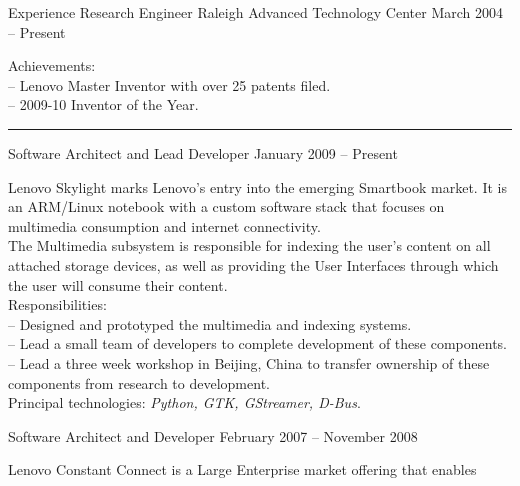 \documentclass[letterpaper, 11pt]{article}
\begin{document}
    \begin{resume}
        \begin{category}{Experience}
                                         {Research Engineer}
                     {Raleigh Advanced Technology Center} {March 2004 -- Present}
            \par
            Achievements: \\
            -- Lenovo Master Inventor with over 25 patents filed. \\
            -- 2009-10 Inventor of the Year. \\
            \rule[1ex]{\textwidth}{1pt}
            \begin{block}
                 {Software Architect and Lead Developer}
                         { }               {January 2009 -- Present}
                \par
                Lenovo Skylight marks Lenovo's entry into the emerging Smartbook market.
                It is an ARM/Linux notebook with a custom software stack that focuses
                on multimedia consumption and internet connectivity.
                \\[1ex]
                The Multimedia subsystem is responsible for indexing the user's content on all
                attached storage devices, as well as providing the User Interfaces through which
                the user will consume their content.
                \\[1ex]
                Responsibilities: \\
                -- Designed and prototyped the multimedia and indexing systems. \\
                -- Lead a small team of developers to complete development of these components. \\
                -- Lead a three week workshop in Beijing, China to transfer ownership of these components from research to development.
                \\[1ex]
                Principal technologies: \emph{Python, GTK, GStreamer, D-Bus}.
                \smallskip
            \end{block}
            \begin{block}
                 {Software Architect and Developer}
                         { }                       {February 2007 -- November 2008}
                \par
                Lenovo Constant Connect is a Large Enterprise market offering that enables

\end{block}
\end{category}
\end{resume}
\end{document}
